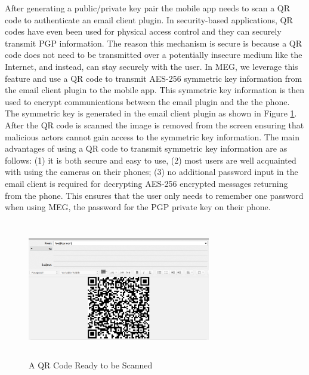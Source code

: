 \documentclass[10pt]{article}
\begin{document}
\begin{multicols}{2}
\par After generating a public/private key pair the mobile app needs to scan a QR code to authenticate an email client plugin. In security-based applications, QR codes have even been used for physical access control and they can securely transmit PGP information\cite{qrcode-authentication,qrcode-key-distribution}. The reason this mechanism is secure is because a QR code does not need to be transmitted over a potentially insecure medium like the Internet, and instead, can stay securely with the user. In MEG, we leverage this feature and use a QR code to transmit AES-256 symmetric key information from the email client plugin to the mobile app. This symmetric key information is then used to encrypt communications between the email plugin and the the phone. The symmetric key is generated in the email client plugin as shown in Figure \ref{fig:qr}. After the QR code is scanned the image is removed from the screen ensuring that malicious actors cannot gain access to the symmetric key information. The main advantages of using a QR code to transmit symmetric key information are as follows: (1) it is both secure and easy to use, (2) most users are well acquainted with using the cameras on their phones; (3) no additional password input in the email client is required for decrypting AES-256 encrypted messages returning from the phone. This ensures that the user only needs to remember one password when using MEG, the password for the PGP private key on their phone.
\begin{figure}[H]
    \centering
    \includegraphics[width=8cm,height=6cm]{qr-code-thunderbird.png}
    \caption{A QR Code Ready to be Scanned}
    \label{fig:qr}
\end{figure}

\end{multicols}
\end{document}
